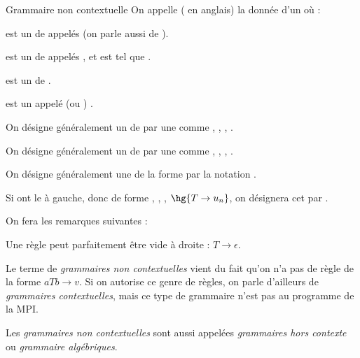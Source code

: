 \documentclass[a4paper,french,bookmarks]{book}
\begin{document}
    \begin{definition}{Grammaire non contextuelle}{}
        On appelle  ( en anglais) la donnée d'un  où :
        \begin{enumerate}
            \itast \hg{$\bcV$} est un  de  appelés  (on parle aussi de ).
        
            \itast \hg{$\Sigma$} est un  de  appelés , et est tel que \hg{$\Sigma \cap \bcV = \emptyset$}.
            
            \itast \hg{$\bcR \subset \bcV \times \p{\Sigma \sqcup \bcV}^\star$} est un  de .
            
            \itast {} est un  appelé  (ou ) .
        \end{enumerate}
    \end{definition}
    
    \begin{notation}
        \begin{enumerate}
            \itt On désigne généralement un  de \hg{$\bcV$} par une  comme , , , \hg{$\dots$}.
            
            \itt On désigne généralement un  de \hg{$\Sigma$} par une  comme , , , \hg{$\dots$}.
            
            \itt On désigne généralement une  de la forme  par la notation .
            
            \itt Si  ont le  à gauche, donc de forme , , \hg{\dots}, $\hg{T \rightarrow u_n}$, on désignera cet  par .
        \end{enumerate}
    \end{notation}
    
    On fera les remarques suivantes :
    \begin{enumerate}
        \itt Une règle peut parfaitement être vide à droite : $T \to \epsilon$.
        
        \itt Le terme de \emph{grammaires non contextuelles} vient du fait qu'on n'a pas de règle de la forme $aTb \to v$. Si on autorise ce genre de règles, on parle d'ailleurs de \emph{grammaires contextuelles}, mais ce type de grammaire n'est pas au programme de la \textsf{MPI}.
        
        \itt Les \emph{grammaires non contextuelles} sont aussi appelées \emph{grammaires hors contexte} ou \emph{grammaire algébriques}.
    \end{enumerate} 
    
\end{document}
